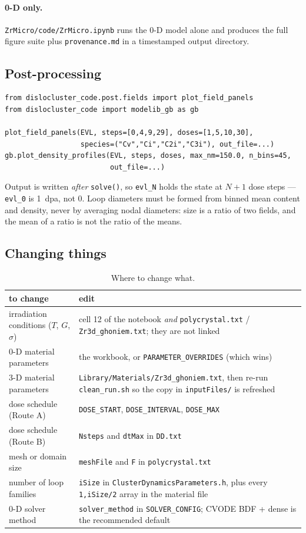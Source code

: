 \documentclass[11pt]{article}
\newcommand{\code}[1]{\texttt{\small #1}}
\newcommand{\file}[1]{\texttt{\footnotesize #1}}
\begin{document}
\paragraph*{0-D only.}
\file{ZrMicro/code/ZrMicro.ipynb} runs the 0-D model alone and produces the full
figure suite plus \file{provenance.md} in a timestamped output directory.

\subsection{Post-processing}

\begin{lstlisting}
from dislocluster_code.post.fields import plot_field_panels
from dislocluster_code import modelib_gb as gb

plot_field_panels(EVL, steps=[0,4,9,29], doses=[1,5,10,30],
                  species=("Cv","Ci","C2i","C3i"), out_file=...)
gb.plot_density_profiles(EVL, steps, doses, max_nm=150.0, n_bins=45,
                         out_file=...)
\end{lstlisting}
Output is written \emph{after} \code{solve()}, so \file{evl\_N} holds the state
at $N+1$ dose steps --- \file{evl\_0} is 1~dpa, not 0. Loop diameters must be
formed from binned mean content and density, never by averaging nodal
diameters: size is a ratio of two fields, and the mean of a ratio is not the
ratio of the means.

\subsection{Changing things}

\begin{table}[htbp]
\centering
\caption{Where to change what.}
\label{tab:whereto}
\begin{tabular}{@{}p{}p{}@{}}
\toprule
to change & edit \\
\midrule
irradiation conditions ($T$, $G$, $\sigma$) &
  cell 12 of the notebook \emph{and} \file{polycrystal.txt} /
  \file{Zr3d\_ghoniem.txt}; they are not linked \\
0-D material parameters &
  the workbook, or \code{PARAMETER\_OVERRIDES} (which wins) \\
3-D material parameters &
  \file{Library/Materials/Zr3d\_ghoniem.txt}, then re-run
  \file{clean\_run.sh} so the copy in \file{inputFiles/} is refreshed \\
dose schedule (Route A) &
  \code{DOSE\_START}, \code{DOSE\_INTERVAL}, \code{DOSE\_MAX} \\
dose schedule (Route B) &
  \code{Nsteps} and \code{dtMax} in \file{DD.txt} \\
mesh or domain size &
  \code{meshFile} and \code{F} in \file{polycrystal.txt} \\
number of loop families &
  \code{iSize} in \file{ClusterDynamicsParameters.h}, plus every
  \code{1,iSize/2} array in the material file \\
0-D solver method &
  \code{solver\_method} in \code{SOLVER\_CONFIG}; CVODE BDF + dense is the
  recommended default \\
\bottomrule
\end{tabular}
\end{table}
\end{document}
